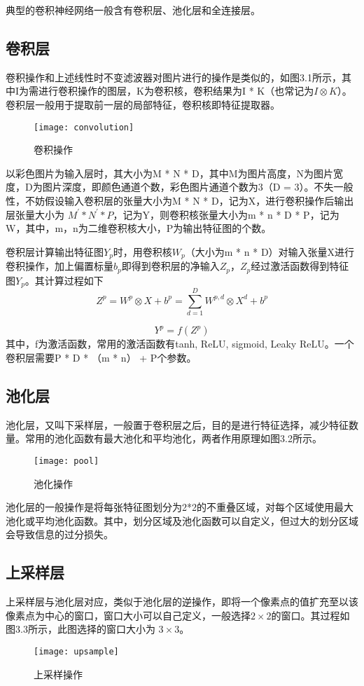 \documentclass[a4paper, 12pt]{report}
\begin{document}
典型的卷积神经网络一般含有卷积层、池化层和全连接层。

\subsection{卷积层\quad}
卷积操作和上述线性时不变滤波器对图片进行的操作是类似的，如图3.1所示，其中I为需进行卷积操作的图层，K为卷积核，卷积结果为I * K（也常记为$I\otimes K$）。卷积层一般用于提取前一层的局部特征，卷积核即特征提取器。
\begin{figure}[h]
\centering
\texttt{[image: convolution]}
\caption{卷积操作}
\end{figure}
以彩色图片为输入层时，其大小为M * N * D，其中M为图片高度，N为图片宽度，D为图片深度，即颜色通道个数，彩色图片通道个数为3（D = 3）。不失一般性，不妨假设输入卷积层的张量大小为M * N * D，记为X，进行卷积操作后输出层张量大小为 $M^{\prime} * N^{\prime} * P$，记为Y，则卷积核张量大小为m * n * D * P，记为W，其中，m，n为二维卷积核大小，P为输出特征图的个数。

卷积层计算输出特征图$Y_p$时，用卷积核$W_p$（大小为m * n * D）对输入张量X进行卷积操作，加上偏置标量$b_p$即得到卷积层的净输入$Z_p$，$Z_p$经过激活函数得到特征图$Y_p$。其计算过程如下
\begin{equation}
Z^p = W^p \otimes X + b^p = \sum_{d = 1}^D W^{p, d} \otimes X^d + b^p
\end{equation}

\begin{equation}
Y^p = f(Z^p)
\end{equation}
其中，f为激活函数，常用的激活函数有tanh, ReLU, sigmoid, Leaky ReLU。一个卷积层需要P * D * （m * n） + P个参数。

\subsection{池化层\quad}
池化层，又叫下采样层，一般置于卷积层之后，目的是进行特征选择，减少特征数量。常用的池化函数有最大池化和平均池化，两者作用原理如图3.2所示。
\begin{figure}[h]
\centering
\texttt{[image: pool]}
\caption{池化操作}
\end{figure}
池化层的一般操作是将每张特征图划分为2*2的不重叠区域，对每个区域使用最大池化或平均池化函数。其中，划分区域及池化函数可以自定义，但过大的划分区域会导致信息的过分损失。

\subsection{上采样层\quad}
上采样层与池化层对应，类似于池化层的逆操作，即将一个像素点的值扩充至以该像素点为中心的窗口，窗口大小可以自己定义，一般选择$2\times 2$的窗口。其过程如图3.3所示，此图选择的窗口大小为 $3 \times 3$。
\begin{figure}[h]
\centering
\texttt{[image: upsample]}
\caption{上采样操作}
\end{figure}
\end{document}
